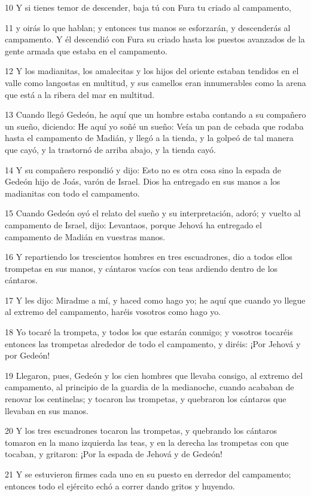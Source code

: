 \par 10 Y si tienes temor de descender, baja tú con Fura tu criado al campamento,
\par 11 y oirás lo que hablan; y entonces tus manos se esforzarán, y descenderás al campamento. Y él descendió con Fura su criado hasta los puestos avanzados de la gente armada que estaba en el campamento.
\par 12 Y los madianitas, los amalecitas y los hijos del oriente estaban tendidos en el valle como langostas en multitud, y sus camellos eran innumerables como la arena que está a la ribera del mar en multitud.
\par 13 Cuando llegó Gedeón, he aquí que un hombre estaba contando a su compañero un sueño, diciendo: He aquí yo soñé un sueño: Veía un pan de cebada que rodaba hasta el campamento de Madián, y llegó a la tienda, y la golpeó de tal manera que cayó, y la trastornó de arriba abajo, y la tienda cayó.
\par 14 Y su compañero respondió y dijo: Esto no es otra cosa sino la espada de Gedeón hijo de Joás, varón de Israel. Dios ha entregado en sus manos a los madianitas con todo el campamento.
\par 15 Cuando Gedeón oyó el relato del sueño y su interpretación, adoró; y vuelto al campamento de Israel, dijo: Levantaos, porque Jehová ha entregado el campamento de Madián en vuestras manos.
\par 16 Y repartiendo los trescientos hombres en tres escuadrones, dio a todos ellos trompetas en sus manos, y cántaros vacíos con teas ardiendo dentro de los cántaros.
\par 17 Y les dijo: Miradme a mí, y haced como hago yo; he aquí que cuando yo llegue al extremo del campamento, haréis vosotros como hago yo.
\par 18 Yo tocaré la trompeta, y todos los que estarán conmigo; y vosotros tocaréis entonces las trompetas alrededor de todo el campamento, y diréis: ¡Por Jehová y por Gedeón!
\par 19 Llegaron, pues, Gedeón y los cien hombres que llevaba consigo, al extremo del campamento, al principio de la guardia de la medianoche, cuando acababan de renovar los centinelas; y tocaron las trompetas, y quebraron los cántaros que llevaban en sus manos.
\par 20 Y los tres escuadrones tocaron las trompetas, y quebrando los cántaros tomaron en la mano izquierda las teas, y en la derecha las trompetas con que tocaban, y gritaron: ¡Por la espada de Jehová y de Gedeón!
\par 21 Y se estuvieron firmes cada uno en su puesto en derredor del campamento; entonces todo el ejército echó a correr dando gritos y huyendo.
